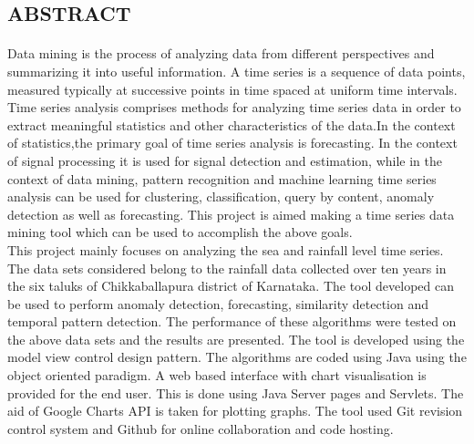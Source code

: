 \documentclass[12pt,a4paper]{report}
\begin{document}
\begin{center}
\section*{ABSTRACT}
\end{center} 

\paragraph{}  Data mining is the process of analyzing data from different perspectives and summarizing it into useful information. A time series is a sequence of data points, measured typically at successive points in time spaced at uniform time intervals. Time series analysis comprises methods for analyzing time series data in order to extract meaningful statistics and other characteristics of the data.In the context of statistics,the primary goal of time series analysis is forecasting. In the context of signal processing it is used for signal detection and estimation, while in the context of data mining, pattern recognition and machine learning time series analysis can be used for clustering, classification, query by content, anomaly detection as well as forecasting. This project is aimed making a time series data mining tool which can be used to accomplish the above goals. \\



This project mainly focuses on analyzing the sea and rainfall level time series. The data sets considered belong to the  rainfall data collected over ten years in the six taluks of Chikkaballapura district of Karnataka. The tool developed can be used to perform anomaly detection, forecasting, similarity detection and temporal pattern detection. The performance of these algorithms were tested on the above data sets and the results are presented. The tool is developed using the model view control design pattern. The algorithms are coded using Java using the object oriented paradigm. A web based interface with chart visualisation is provided for the end user. This is done using Java Server pages and Servlets.  The aid of Google Charts API is taken for plotting graphs. The tool used  Git revision control system and Github for online collaboration and code hosting.  \\
\end{document}
